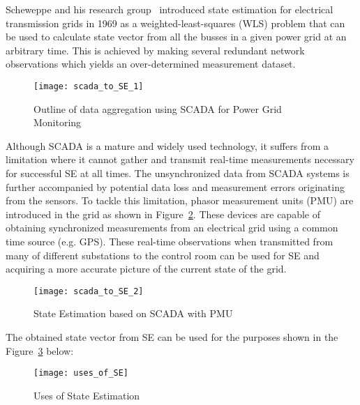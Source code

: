 \documentclass[thesis.tex]{subfiles}
\begin{document}
Scheweppe and his research group~\cite{Schweppe} introduced state estimation for electrical transmission grids in 1969 as a weighted-least-squares (WLS) problem that can be used to calculate state vector from all the busses in a given power grid at an arbitrary time. This is achieved by making several redundant network observations which yields an over-determined measurement dataset.
\begin{figure}[H]
	\centering
	\texttt{[image: scada\_to\_SE\_1]}
	\caption{Outline of data aggregation using SCADA for Power Grid Monitoring}
	\label{fig:scada_to_SE_1}
\end{figure}
Although SCADA is a mature and widely used technology, it suffers from a limitation where it cannot gather and transmit real-time measurements necessary for successful SE at all times. The unsynchronized data from SCADA systems is further accompanied by potential data loss and measurement errors originating from the sensors. To tackle this limitation, phasor measurement units (PMU) are introduced in the grid as shown in Figure~\ref{fig:scada_to_SE_2}. These devices are capable of obtaining synchronized measurements from an electrical grid using a common time source (e.g. GPS). These real-time observations when transmitted from many of different substations to the control room can be used for SE and acquiring a more accurate picture of the current state of the grid.
\begin{figure}[H]
	\centering
	\texttt{[image: scada\_to\_SE\_2]}
	\caption{State Estimation based on SCADA with PMU~\cite{Gaushell}}
	\label{fig:scada_to_SE_2}
\end{figure}
The obtained state vector from SE can be used for the purposes shown in the Figure~\ref{fig:uses_of_SE} below:
\begin{figure}[H]
	\centering
	\texttt{[image: uses\_of\_SE]}
	\caption{Uses of State Estimation~\cite{Wilson}}
	\label{fig:uses_of_SE}
\end{figure}
\end{document}
